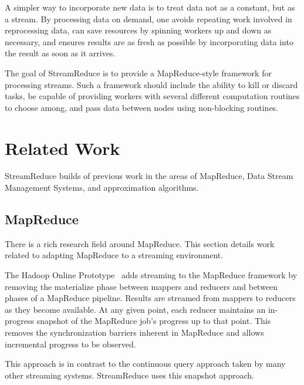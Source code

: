 \documentclass[12pt,twocolumn]{article}
\begin{document}
A simpler way to incorporate new data is to treat data not as a constant, but as a
stream. By processing data on demand, one avoids repeating work involved in reprocessing
data, can save resources
by spinning workers up and down as necessary, and ensures results are as fresh as possible
by incorporating data into the result as soon as it arrives.

The goal of StreamReduce is to provide a MapReduce-style framework for processing
streams. Such a
framework should include the ability to kill or discard tasks, be capable of
providing workers with several different computation routines to choose among, and pass
data
between nodes using non-blocking routines.

\section{Related Work}
\label{sec:relwork}
%

StreamReduce builds of previous work in the areas of MapReduce, Data Stream Management
Systems,
and approximation algorithms.

\subsection{MapReduce}
There is a rich research field around MapReduce. This section details work related to
adapting
MapReduce to a streaming environment.

The Hadoop Online Prototype~\cite{Condie:EECS-2009-136} adds streaming to the
MapReduce framework
by removing the materialize phase between mappers and reducers and between phases of a
MapReduce pipeline. Results are streamed from mappers to reducers as they become
available.
At any given point, each reducer maintains an in-progress snapshot of the MapReduce job's
progress up to that point. This removes the synchronization barriers inherent in MapReduce
and allows incremental progress to be observed.

This approach is in contrast to the continuous query approach taken by many other
streaming
systems. StreamReduce uses this snapshot approach.
\end{document}

